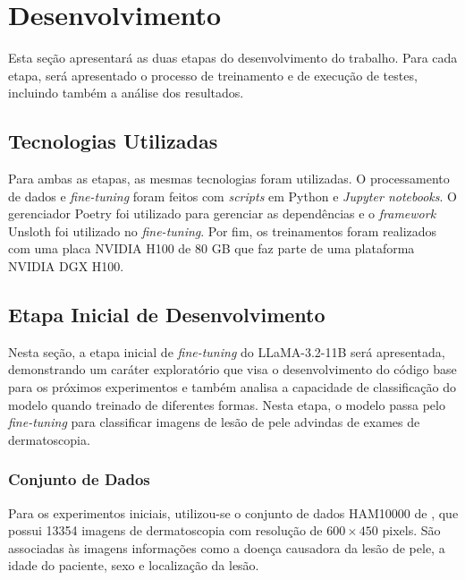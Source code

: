 \chapter{Desenvolvimento}

Esta seção apresentará as duas etapas do desenvolvimento do trabalho. Para cada etapa, será apresentado o processo de
treinamento e de execução de testes, incluindo também a análise dos resultados.

\section{Tecnologias Utilizadas}

Para ambas as etapas, as mesmas tecnologias foram utilizadas. O processamento de dados e \textit{fine-tuning} foram
feitos com \textit{scripts} em Python e \textit{Jupyter notebooks}. O gerenciador Poetry foi utilizado para gerenciar
as dependências e o \textit{framework} Unsloth foi utilizado no \textit{fine-tuning}. Por fim, os treinamentos foram
realizados com uma placa NVIDIA H100 de 80 GB que faz parte de uma plataforma NVIDIA DGX H100.

\section{Etapa Inicial de Desenvolvimento}

Nesta seção, a etapa inicial de \textit{fine-tuning} do \ac{LLaMA}-3.2-11B será apresentada, demonstrando um caráter
exploratório que visa o desenvolvimento do código base para os próximos experimentos e também analisa a capacidade
de classificação do modelo quando treinado de diferentes formas. Nesta etapa, o modelo passa pelo \textit{fine-tuning}
para classificar imagens de lesão de pele advindas de exames de dermatoscopia.

\subsection{Conjunto de Dados}

Para os experimentos iniciais, utilizou-se o conjunto de dados \ac{HAM10000} de \textcite{tschandl2018ham10000}, que
possui 13354 imagens de dermatoscopia com resolução de \begin{math}600 \times 450\end{math} pixels. São associadas às
imagens informações como a doença causadora da lesão de pele, a idade do paciente, sexo e localização da lesão.

